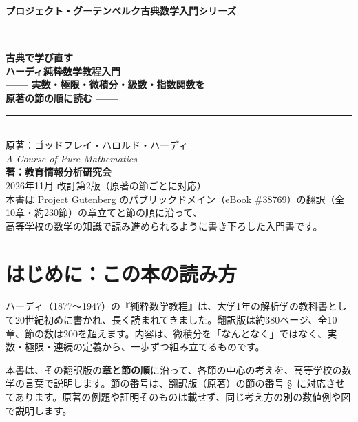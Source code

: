 \documentclass[a4paper,11pt,openany]{ltjsbook}
\begin{document}
\begin{titlepage}
\begin{center}
\vspace*{1.5cm}
{\Large\bfseries プロジェクト・グーテンベルク古典数学入門シリーズ}\\[0.8cm]
\rule{\textwidth}{1.5pt}\\[0.4cm]
{\Huge\bfseries 古典で学び直す\\ハーディ純粋数学教程入門}\\[0.4cm]
{\Large\bfseries —— 実数・極限・微積分・級数・指数関数を\\原著の節の順に読む ——}\\[0.4cm]
\rule{\textwidth}{1.5pt}\\[1.5cm]
{\large 原著：ゴッドフレイ・ハロルド・ハーディ\\
\textit{A Course of Pure Mathematics}}\\[2.0cm]
{\Large\bfseries 著：教育情報分析研究会}\\[2.5cm]
\vfill
{\large 2026年11月 改訂第2版（原著の節ごとに対応）}\\[0.5cm]
{\footnotesize 本書は Project Gutenberg のパブリックドメイン（eBook \#38769）の翻訳（全10章・約230節）の章立てと節の順に沿って、\\
高等学校の数学の知識で読み進められるように書き下ろした入門書です。}
\end{center}
\end{titlepage}

\frontmatter
\tableofcontents
\mainmatter

\chapter*{はじめに：この本の読み方}

ハーディ（1877〜1947）の『純粋数学教程』は、大学1年の解析学の教科書として20世紀初めに書かれ、長く読まれてきました。翻訳版は約380ページ、全10章、節の数は200を超えます。内容は、微積分を「なんとなく」ではなく、実数・極限・連続の定義から、一歩ずつ組み立てるものです。

本書は、その翻訳版の\textbf{章と節の順}に沿って、各節の中心の考えを、高等学校の数学の言葉で説明します。節の番号は、翻訳版（原著）の節の番号 \S\ に対応させてあります。原著の例題や証明そのものは載せず、同じ考え方の別の数値例や図で説明します。
\end{document}
